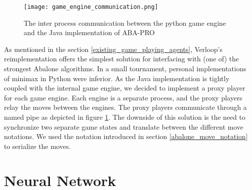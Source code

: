 \begin{figure}
    \centering
    \texttt{[image: game\_engine\_communication.png]}
    \caption{The inter process communication between the python game engine and the Java implementation of ABA-PRO}
    \label{python_java_ipc}
\end{figure}

As mentioned in the section \ref{existing_game_playing_agents}, Verloop's reimplementation \cite{verloop_abaloneai_nodate} offers the simplest solution for interfacing with (one of) the strongest Abalone algorithms. In a small tournament, personal implementations of minimax in Python \cite{claussen_abalone_2021} were inferior. As the Java implementation is tightly coupled with the internal game engine, we decided to implement a proxy player for each game engine. Each engine is a separate process, and the proxy players relay the moves between the engines. The proxy players communicate through a named pipe as depicted in figure \ref{python_java_ipc}. The downside of this solution is the need to synchronize two separate game states and translate between the different move notations. We used the notation introduced in section \ref{abalone_move_notation} to serialize the moves.


\section{Neural Network}
